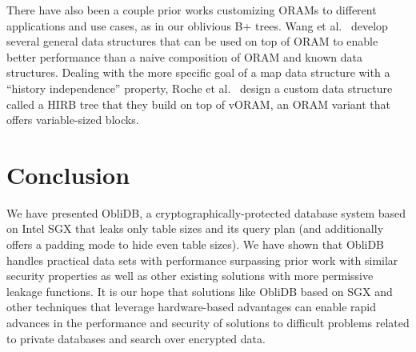 \documentclass[letterpaper,twocolumn,10pt]{article}
\def\name/{ObliDB}
\begin{document}
\medskip
There have also been a couple prior works customizing ORAMs to different applications and use cases, as in our oblivious B+ trees. Wang et al.~\cite{WNL+14} develop several general data structures that can be used on top of ORAM to enable better performance than a naive composition of ORAM and known data structures. Dealing with the more specific goal of a map data structure with a ``history independence'' property, Roche et al.~\cite{RAC16} design a custom data structure called a HIRB tree that they build on top of vORAM, an ORAM variant that offers variable-sized blocks.

\section{Conclusion}\label{conclusion}
We have presented \name/, a cryptographically-protected database system based on Intel SGX that leaks only table sizes and its query plan (and additionally offers a padding mode to hide even table sizes). We have shown that \name/ handles practical data sets with performance surpassing prior work with similar security properties as well as other existing solutions with more permissive leakage functions. It is our hope that solutions like \name/ based on SGX and other techniques that leverage hardware-based advantages can enable rapid advances in the performance and security of solutions to difficult problems related to private databases and search over encrypted data.


{\footnotesize 
}


\end{document}

